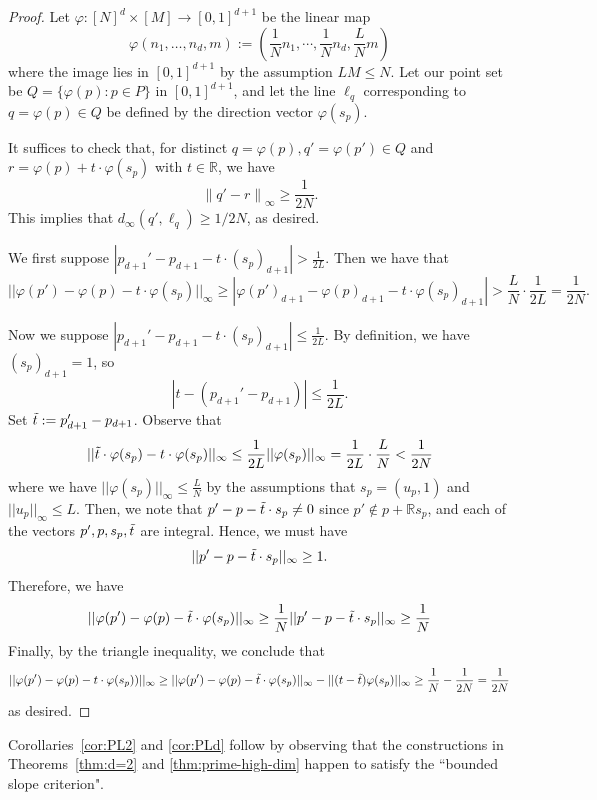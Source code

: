 \documentclass[12pt,reqno]{amsart}
\theoremstyle{plain}
\theoremstyle{definition}
\newcommand{\R}{\mathbb{R}}
\newcommand{\1}{\mathbf{1}}
\newcommand{\abs}[1]{\left|#1\right|}
\begin{document}
\begin{proof}
    Let $\varphi: [N]^d \times [M]\to [0,1]^{d+1}$ be the linear map $$\varphi(n_1,\dots,n_d,m) :=\left(\frac{1}{N} n_1, \cdots, \frac{1}{N} n_d, \frac{L}{N} m\right)$$
    where the image lies in $[0, 1]^{d + 1}$ by the assumption $LM \le N$. Let our point set be $Q = \{\varphi(p): p \in P\}$ in $[0, 1]^{d + 1}$, and let the line $\ell_q$ corresponding to $q = \varphi(p) \in Q$ be defined by the direction vector $\varphi(s_p)$.

    It suffices to check that, for distinct $q = \varphi(p), q' = \varphi(p')\in Q$ and $r = \varphi(p)+t\cdot \varphi(s_p)$ with $t \in \R$, we have
    $$\lVert{q' - r\rVert}_\infty\ge \frac{1}{2N}.$$ 
    This implies that $d_{\infty}(q', \ell_{q}) \ge 1 / 2N$, as desired. 

    We first suppose $\abs{p_{d+1}'-p_{d+1}-t\cdot (s_p)_{d+1}} > \frac{1}{2L}$. Then we have that 
    $$||\varphi(p')-\varphi(p)-t\cdot \varphi(s_{p})||_\infty\ge |\varphi(p')_{d+1}-\varphi(p)_{d+1}-t\cdot \varphi(s_p)_{d+1}|> \frac{L}{N}\cdot \frac{1}{2L}=\frac{1}{2N}.$$

    Now we suppose $\abs{p_{d+1}'-p_{d+1}-t\cdot (s_p)_{d+1}} \leq \frac{1}{2L}$. By definition, we have
    $(s_p)_{d+1} = 1$, so
    $$\abs{t - (p_{d+1}'-p_{d+1})} \leq \frac{1}{2L}.$$
    Set $\Tilde{t}:= p_{d+1}'-p_{d+1}$. Observe that 
    $$||\Tilde{t}\cdot \varphi(s_p)-t\cdot \varphi(s_p)||_\infty \le \frac{1}{2L}||\varphi(s_p)||_\infty = \frac{1}{2L} \cdot \frac{L}{N}< \frac{1}{2N}$$
    where we have $||\varphi(s_p)||_\infty \leq \frac{L}{N}$ by the assumptions that $s_p = (u_p, 1)$ and $||u_p||_\infty \leq L$. Then, we note that $p'-p-\Tilde{t}\cdot s_p \neq 0$ since $p'\not\in p+ \R s_p$, and each of the vectors $p', p, s_p, \Tilde{t}$ are integral. Hence, we must have
    $$|| p'-p-\Tilde{t}\cdot s_p ||_\infty \geq 1.$$
    Therefore, we have
    $$||\varphi(p') - \varphi(p) - \Tilde{t}\cdot \varphi(s_p)||_\infty \geq \frac{1}{N} || p'-p-\Tilde{t}\cdot s_p ||_\infty \geq \frac{1}{N}$$
    Finally, by the triangle inequality, we conclude that
    \[||\varphi(p') - \varphi(p) - t\cdot \varphi(s_p))||_\infty \ge ||\varphi(p') - \varphi(p) - \Tilde{t}\cdot \varphi(s_p)||_\infty -||(t-\Tilde{t})\varphi(s_p)||_\infty \geq \frac{1}{N}-\frac{1}{2N}=\frac{1}{2N}\]
    as desired.
\end{proof}
Corollaries~\ref{cor:PL2} and \ref{cor:PLd} follow by observing that the constructions in Theorems~\ref{thm:d=2} and \ref{thm:prime-high-dim} happen to satisfy the ``bounded slope criterion".
\end{document}
